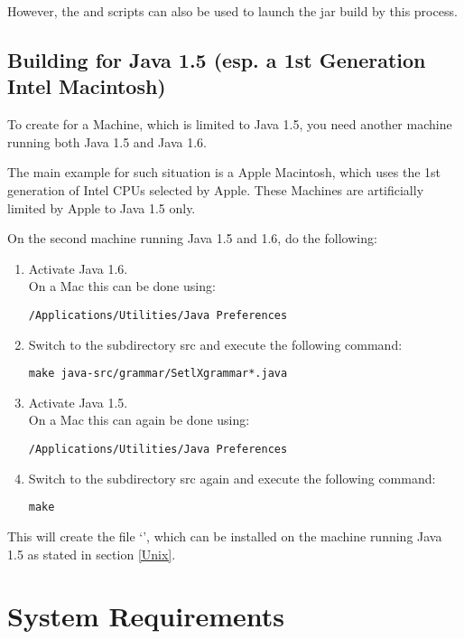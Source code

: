 However, the  and  scripts can also be used to launch the jar build by this process.

\subsection{Building for Java 1.5 (esp. a 1st Generation Intel Macintosh)}\label{MACj5}

To create \setlX{} for a Machine, which is limited to Java 1.5, you need another machine running both Java 1.5 and Java 1.6.

The main example for such situation is a Apple Macintosh, which uses the 1st generation of Intel CPUs selected by Apple. These Machines are artificially limited by Apple to Java 1.5 only.

On the second machine running Java 1.5 and 1.6, do the following:

\begin{enumerate}
	\item Activate Java 1.6.\\
		On a Mac this can be done using:
\begin{lstlisting}[frame=none,numbers=none]
/Applications/Utilities/Java Preferences
\end{lstlisting}
	\item Switch to the subdirectory src and execute the following command:
\begin{lstlisting}[frame=none,numbers=none]
make java-src/grammar/SetlXgrammar*.java
\end{lstlisting}
	\item Activate Java 1.5.\\
		On a Mac this can again be done using:
\begin{lstlisting}[frame=none,numbers=none]
/Applications/Utilities/Java Preferences
\end{lstlisting}
	\item Switch to the subdirectory src again and execute the following command:
\begin{lstlisting}[frame=none,numbers=none]
make
\end{lstlisting}
\end{enumerate}
This will create the file `', which can be installed on the machine running Java 1.5 as stated in section \ref{Unix}.

\section{System Requirements}

